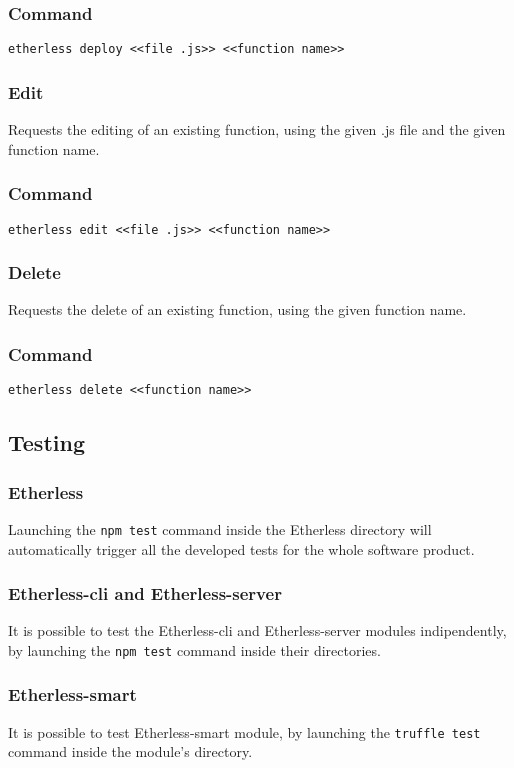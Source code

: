 	\subsubsection*{Command}
	\texttt{etherless deploy <<file .js>> <<function name>>}
	\subsubsection{Edit}
	Requests the editing of an existing function, using the given .js file and the given function name.
	\subsubsection*{Command}
	\texttt{etherless edit <<file .js>> <<function name>>}
	\subsubsection{Delete}
	Requests the delete of an existing function, using the given function name.
	\subsubsection*{Command}
	\texttt{etherless delete <<function name>>}
\subsection{Testing}
\subsubsection{Etherless}
Launching the \texttt{npm test} command inside the Etherless directory will automatically trigger all the developed tests for the whole software product.
\subsubsection{Etherless-cli and Etherless-server}
It is possible to test the Etherless-cli and Etherless-server modules indipendently, by launching the \texttt{npm test} command inside their directories.
\subsubsection{Etherless-smart}
It is possible to test Etherless-smart module, by launching the \texttt{truffle test} command inside the module's directory.
